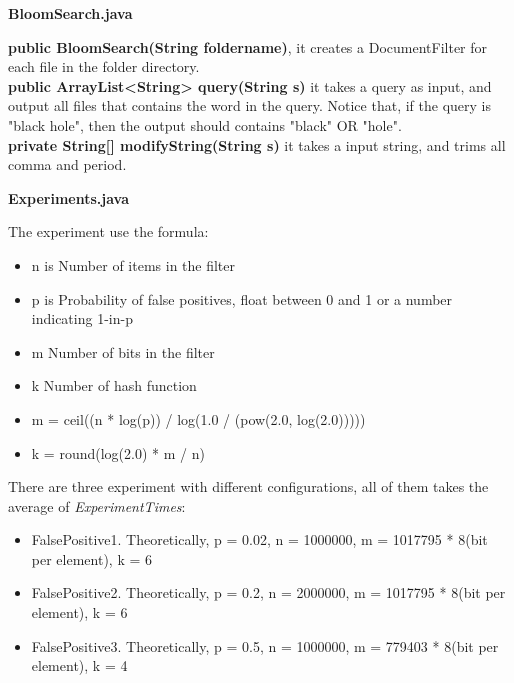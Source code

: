 \documentclass[a4paper,14pt]{article}
\begin{document}
\clearpage

\begin{center}
\textbf{{\large BloomSearch.java}}
\end{center}
\textbf{public BloomSearch(String foldername)}, it creates a DocumentFilter for each file in the folder directory.
\\[6pt]
\textbf{public ArrayList<String> query(String s)} it takes a query as input, and output all files that contains the word in the query. Notice that, if the query is "black hole", then the output should contains "black" OR "hole".
\\[6pt]
\textbf{private String[] modifyString(String s)} it takes a input string, and trims all comma and period.

\clearpage

\begin{center}
\textbf{{\large Experiments.java}}
\end{center}
The experiment use the formula:
\begin{itemize}
  \item n is Number of items in the filter
  \item p is Probability of false positives, float between 0 and 1 or a number indicating 1-in-p
  \item m Number of bits in the filter
  \item  k Number of hash function
  \item m = ceil((n * log(p)) / log(1.0 / (pow(2.0, log(2.0)))))
  \item k = round(log(2.0) * m / n)
\end{itemize}
There are three experiment with different configurations, all of them takes the average of \textit{ExperimentTimes}:
\begin{itemize}
  \item FalsePositive1. Theoretically, p = 0.02, n = 1000000, m = 1017795 * 8(bit per element), k = 6
  \item FalsePositive2. Theoretically, p = 0.2, n = 2000000, m = 1017795 * 8(bit per element), k = 6
  \item FalsePositive3. Theoretically, p = 0.5, n = 1000000, m = 779403 * 8(bit per element), k = 4
\end{itemize} 

\clearpage
\end{document}
